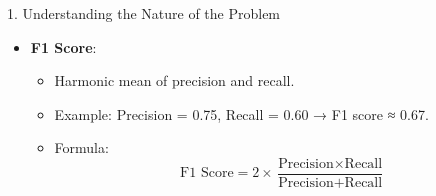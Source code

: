 \documentclass{beamer}
\begin{document}
\begin{frame}[fragile]
\begin{block}{1. Understanding the Nature of the Problem}
\begin{itemize}
\begin{itemize}
                \item \textbf{F1 Score}: 
                \begin{itemize}
                    \item Harmonic mean of precision and recall.
                    \item Example: Precision = 0.75, Recall = 0.60 → F1 score ≈ 0.67.
                    \item Formula: 
                    \begin{equation}
                    \text{F1 Score} = 2 \times \frac{\text{Precision} \times \text{Recall}}{\text{Precision} + \text{Recall}}
                    \end{equation}
                \end{itemize}
            \end{itemize}
        \end{itemize}
    \end{block}
\end{frame}
\end{document}
